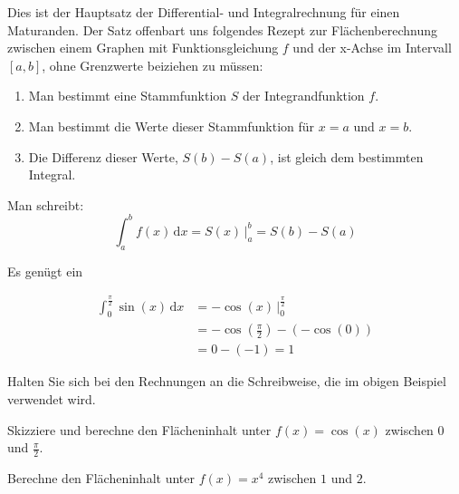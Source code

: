 \documentclass[%
11pt,%
twoside,%
titlepage,%
german,%
headsepline%
]{scrartcl}
\begin{document}
\begin{bem}
Dies ist der Hauptsatz der Differential- und Integralrechnung für einen Maturanden. Der Satz offenbart uns folgendes Rezept zur Flächenberechnung zwischen einem Graphen mit Funktionsgleichung $f$ und der x-Achse im Intervall $[a,b]$, ohne Grenzwerte beiziehen zu müssen:
\begin{enumerate}
\item Man bestimmt eine Stammfunktion $S$ der Integrandfunktion $f$.
\item Man bestimmt die Werte dieser Stammfunktion für $x=a$ und $x=b$.
\item Die Differenz dieser Werte, $S(b)-S(a)$, ist gleich dem bestimmten Integral.
\end{enumerate}

Man schreibt:
$$\int_a^bf(x)\,\mathrm{d}x=S(x)\,|^b_a=S(b)-S(a)$$
\end{bem}

Es genügt ein
\begin{bsp}
\begin{align*}
\int_0^{\frac{\pi}{2}}\sin(x)\,\mathrm{d}x&=-\cos(x)\,|_0^{\frac{\pi}{2}}\\
&=-\cos(\frac{\pi}{2})-(-\cos(0))\\
&=0-(-1)=1
\end{align*}
\end{bsp}

Halten Sie sich bei den Rechnungen an die Schreibweise, die im obigen Beispiel verwendet wird.
\begin{ueb}[Flächeninhalt]
Skizziere und berechne den Flächeninhalt unter $f(x)=\cos(x)$ zwischen $0$ und $\frac{\pi}{2}$.
\end{ueb}

\begin{ueb}[Fläche]
Berechne den Flächeninhalt unter $f(x)=x^4$ zwischen $1$ und $2$.
\end{ueb}
\end{document}
